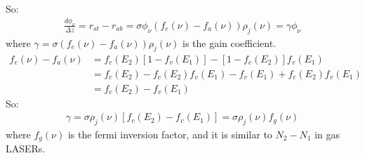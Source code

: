 \documentclass[11pt]{article}
\begin{document}
So:
\begin{align*}
    \frac{d\phi_\nu}{\Delta z} = r_{st} - r_{ab} = \sigma \phi_\nu (f_e(\nu) - f_a(\nu)) \rho_j (\nu) = \gamma \phi_\nu
\end{align*}
where $\gamma = \sigma (f_e(\nu) - f_a(\nu)) \rho_j (\nu)$ is the gain coefficient.
\begin{align*}
    f_e(\nu) - f_a(\nu) &= f_c(E_2) [1 - f_v(E_1)] - [1 - f_c(E_2)] f_v(E_1) \\
    &= f_c(E_2) - f_c(E_2) f_v(E_1) - f_v(E_1) + f_c(E_2) f_v(E_1) \\
    &= f_c(E_2) - f_v(E_1) 
\end{align*}
So:
\begin{align*}
    \gamma = \sigma \rho_j (\nu) [f_c(E_2) - f_v(E_1)] = \sigma \rho_j (\nu) f_g (\nu)
\end{align*}
where $f_g (\nu)$ is the fermi inversion factor, and it is similar to $N_2-N_1$ in gas LASERs. 
\end{document}
